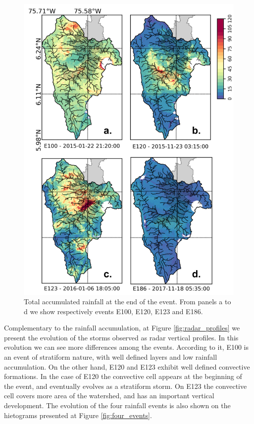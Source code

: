 \documentclass[preprint,12pt]{elsarticle}
\begin{document}
\begin{figure}[!h]
    \centering
    \includegraphics[width=14cm]{Figuras/Rainfall_accumulation.png}
    \caption{Total accumulated rainfall at the end of the event.  From panels a to d we show respectively events E100, E120, E123 and E186.}
    \label{fig:rainfall_acum}
\end{figure}
Complementary to the rainfall accumulation, at Figure \ref{fig:radar_profiles} we present the evolution of the storms observed as radar vertical profiles. In this evolution we can see more differences among the events.  According to it, E100 is an event of stratiform nature, with well defined layers and low rainfall accumulation.  On the other hand, E120 and E123 exhibit well defined convective formations.  In the case of E120 the convective cell appears at the beginning of the event, and eventually evolves as a stratiform storm.  On E123 the convective cell covers more area of the watershed, and has an important vertical development.  The evolution of the four rainfall events is also shown on the hietograms presented at Figure \ref{fig:four_events}.  
\end{document}
